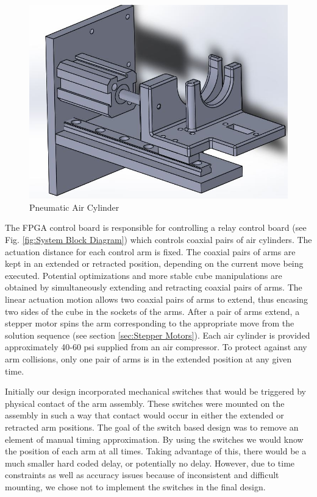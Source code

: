 \documentclass[final, letterpaper, 10 pt, conference, onecolumn]{IEEEtran}
\begin{document}
\begin{figure}[!ht]
\centering
\includegraphics[scale=0.5]{AirCylinder.jpg}
\caption{Pneumatic Air Cylinder}
\label{fig:Pneumatic Air Cylinder}
\end{figure}

The FPGA control board is responsible for controlling a relay control board (see Fig. \ref{fig:System Block Diagram}) which controls coaxial pairs of air cylinders. The actuation distance for each control arm is fixed. The coaxial pairs of arms are kept in an extended or retracted position, depending on the current move being executed. Potential optimizations and more stable cube manipulations  are obtained by simultaneously extending and retracting coaxial pairs of arms. The linear actuation motion allows two coaxial pairs of
arms to extend, thus encasing two sides of the cube in the sockets of the arms. After a pair of arms extend,
a stepper motor spins the arm corresponding to the appropriate move from the solution sequence (see section \ref{sec:Stepper Motors}). Each air cylinder is provided approximately 40-60 psi supplied from an air compressor. To protect against any arm collisions, only one pair of arms is in the extended position at any given time.

Initially our design incorporated mechanical switches that would be triggered by physical contact of the arm assembly.  These switches were mounted on the assembly in such a way that contact would occur in either the extended or retracted arm positions.  The goal of the switch based design was to remove an element of manual timing approximation.  By using the switches we would know the position of each arm at all times.  Taking advantage of this, there would be a much smaller hard coded delay, or potentially no delay.  However, due to time constraints as well as accuracy issues because of inconsistent and difficult mounting, we chose not to implement the switches in the final design.   
 
\end{document}

